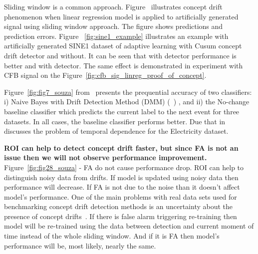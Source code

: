 \documentclass[12 pt]{article}
\begin{document}
  Sliding window is a common approach.
  Figure~\cite{fig:art_sig_example} illustrates concept drift phenomenon when linear regression model is applied to artificially generated signal using sliding window approach. 
  The figure shows predictions and prediction errors.
  Figure ~\ref{fig:sine1_example} illustrates an example with artificially generated SINE1 dataset of adaptive learning with Cusum concept drift detector and without. 
  It can be seen that with detector performance is better and with detector.
  The same effect is demonstrated in experiment with CFB signal on the Figure~\ref{fig:cfb_sig_linreg_proof_of_concept}.

  Figure~\ref{fig:fig7_souza} from~\cite{SouzaRMB20} presents the prequential accuracy of two classifiers: i) Naive Bayes with Drift Detection Method (DMM) (~\cite{gama2004learning}) , and ii) the No-change baseline classifier which predicts the current label to the next event for three datasets. In all cases, the baseline classifier performs better.
  Due that in~\cite{zliobaite2013good} discusses the problem of temporal dependence for the Electricity dataset.

  \textbf{ROI can help to detect concept drift faster, but since FA is not an issue then we will not observe performance improvement.}
  Figure~\ref{fig:fig28_souza} - FA do not cause performance drop.
  ROI can help to distinguish noisy data from drifts. If model is updated using noisy data then performance will decrease.
  If FA is not due to the noise than it doesn't affect model's performance. 
  One of the main problems with real data sets used for benchmarking concept drift detection methods is an uncertainty about the presence of concept drifts~\cite{SouzaRMB20}.
  If there is false alarm triggering re-training then model will be re-trained using the data between detection and current moment of time instead of the whole sliding window.
  And if it is FA then model's performance will be, most likely, nearly the same.
\end{document}
